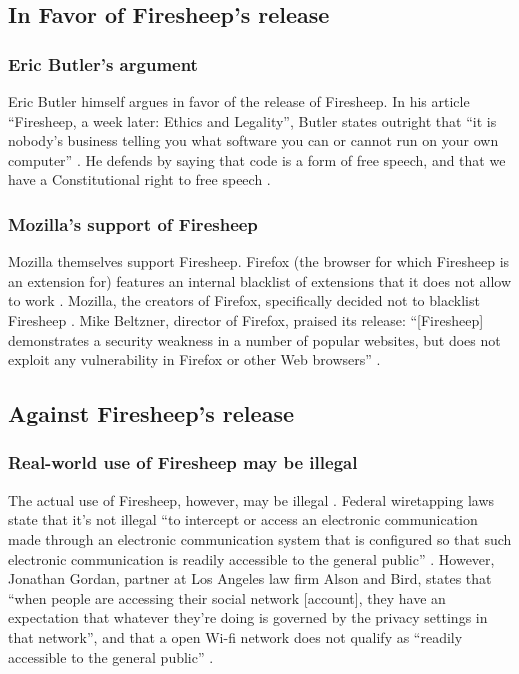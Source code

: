 \documentclass[12pt,twocolumn]{article}
\begin{document}
\subsection{In Favor of Firesheep's release}
\subsubsection{Eric Butler's argument}
Eric Butler himself argues in favor of the release of Firesheep. In his article ``Firesheep, a week later: Ethics and Legality'', Butler states outright that ``it is nobody's business telling you what software you can or cannot run on your own computer'' \cite{butler-week-later}. He defends by saying that code is a form of free speech, and that we have a Constitutional right to free speech \cite{butler-week-later}.

\subsubsection{Mozilla's support of Firesheep}
Mozilla themselves support Firesheep. Firefox (the browser for which Firesheep is an extension for) features an internal blacklist of extensions that it does not allow to work \cite{mozilla-blocklist}. Mozilla, the creators of Firefox, specifically decided not to blacklist Firesheep \cite{no-kill-switch}. Mike Beltzner, director of Firefox, praised its release: ``[Firesheep] demonstrates a security weakness in a number of popular websites, but does not exploit any vulnerability in Firefox or other Web browsers'' \cite{no-kill-switch}.


\subsection{Against Firesheep's release}
\subsubsection{Real-world use of Firesheep may be illegal}
The actual use of Firesheep, however, may be illegal \cite{illegal-to-use-firesheep}. Federal wiretapping laws state that it's not illegal ``to intercept or access an electronic communication made through an electronic communication system that is configured so that such electronic communication is readily accessible to the general public'' \cite{illegal-to-use-firesheep}. However, Jonathan Gordan, partner at Los Angeles law firm Alson and Bird, states that ``when people are accessing their social network [account], they have an expectation that whatever they're doing is governed by the privacy settings in that network'', and that a open Wi-fi network does not qualify as ``readily accessible to the general public'' \cite{illegal-to-use-firesheep}.
\end{document}
